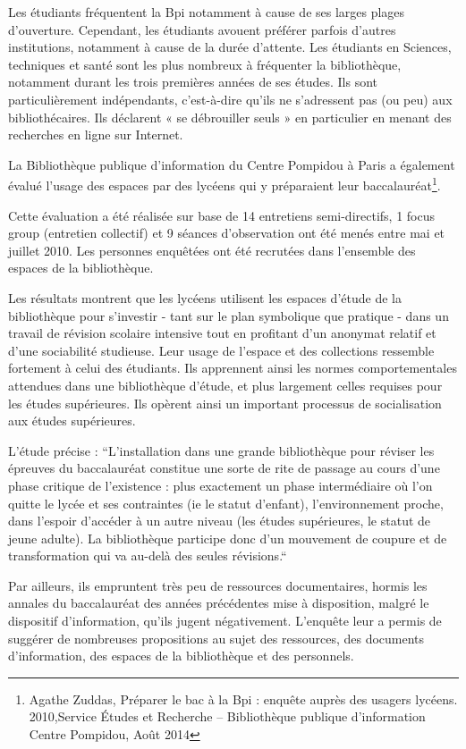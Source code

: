 \documentclass[french,a4paper,12pt]{article}
\begin{document}
Les étudiants fréquentent la Bpi notamment à cause de ses larges plages d’ouverture. Cependant, les étudiants avouent préférer parfois d’autres institutions, notamment à cause de la durée d’attente. Les étudiants en Sciences, techniques et santé sont les plus nombreux à fréquenter la bibliothèque, notamment durant les trois premières années de ses études. Ils sont particulièrement indépendants, c’est-à-dire qu’ils ne s’adressent pas (ou peu) aux bibliothécaires. Ils déclarent « se débrouiller seuls » en particulier en menant des recherches en ligne sur Internet. 

\quad La Bibliothèque publique d’information du Centre Pompidou à Paris a également évalué l’usage des espaces par des lycéens qui y préparaient leur baccalauréat\footnote{Agathe Zuddas, Préparer le bac à la Bpi : enquête auprès des usagers lycéens. 2010,Service Études et Recherche – Bibliothèque publique d'information Centre Pompidou, Août 2014}. 

Cette évaluation a été réalisée sur base de 14 entretiens semi-directifs, 1 focus group (entretien collectif) et 9 séances d’observation ont été menés entre mai et juillet 2010. Les personnes enquêtées ont été recrutées dans l’ensemble des espaces de la bibliothèque. 

Les résultats montrent que les lycéens utilisent les espaces d’étude de la bibliothèque pour s’investir - tant sur le plan symbolique que pratique - dans un travail de révision scolaire intensive tout en profitant d’un anonymat relatif et d’une sociabilité studieuse. Leur usage de l’espace et des collections ressemble fortement à celui des étudiants. Ils apprennent ainsi les normes comportementales attendues dans une bibliothèque d’étude, et plus largement celles requises pour les études supérieures. Ils opèrent ainsi un important processus de socialisation aux études supérieures.  

L’étude précise : “L’installation dans une grande bibliothèque pour réviser les épreuves du baccalauréat constitue une sorte de rite de passage au cours d’une phase critique de l’existence : plus exactement un phase intermédiaire où l’on quitte le lycée et ses contraintes (ie le statut d’enfant), l’environnement proche, dans l’espoir d’accéder à un autre niveau (les études supérieures, le statut de jeune adulte). La bibliothèque participe donc d’un mouvement de coupure et de transformation qui va au-delà des seules révisions.“ 

Par ailleurs, ils empruntent très peu de ressources documentaires, hormis les annales du baccalauréat des années précédentes mise à disposition, malgré le dispositif d’information, qu’ils jugent négativement. L'enquête leur a permis de suggérer de nombreuses propositions au sujet des ressources, des documents d’information, des espaces de la bibliothèque et des personnels. 
\end{document}
